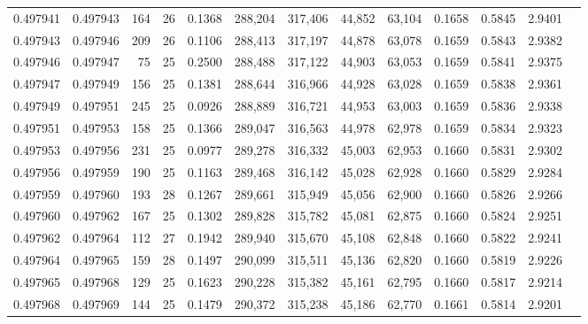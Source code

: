 \begin{tabular}{rrrrrrrrrrrrr}
0.497941 & 0.497943 & 164 &  26 &                                     0.1368 & 288,204 & 317,406 &  44,852 &  63,104 & 0.1658 & 0.5845 & 2.9401 \\
0.497943 & 0.497946 & 209 &  26 &                                     0.1106 & 288,413 & 317,197 &  44,878 &  63,078 & 0.1659 & 0.5843 & 2.9382 \\
0.497946 & 0.497947 &  75 &  25 &                                     0.2500 & 288,488 & 317,122 &  44,903 &  63,053 & 0.1659 & 0.5841 & 2.9375 \\
0.497947 & 0.497949 & 156 &  25 &                                     0.1381 & 288,644 & 316,966 &  44,928 &  63,028 & 0.1659 & 0.5838 & 2.9361 \\
0.497949 & 0.497951 & 245 &  25 &                                     0.0926 & 288,889 & 316,721 &  44,953 &  63,003 & 0.1659 & 0.5836 & 2.9338 \\
0.497951 & 0.497953 & 158 &  25 &                                     0.1366 & 289,047 & 316,563 &  44,978 &  62,978 & 0.1659 & 0.5834 & 2.9323 \\
0.497953 & 0.497956 & 231 &  25 &                                     0.0977 & 289,278 & 316,332 &  45,003 &  62,953 & 0.1660 & 0.5831 & 2.9302 \\
0.497956 & 0.497959 & 190 &  25 &                                     0.1163 & 289,468 & 316,142 &  45,028 &  62,928 & 0.1660 & 0.5829 & 2.9284 \\
0.497959 & 0.497960 & 193 &  28 &                                     0.1267 & 289,661 & 315,949 &  45,056 &  62,900 & 0.1660 & 0.5826 & 2.9266 \\
0.497960 & 0.497962 & 167 &  25 &                                     0.1302 & 289,828 & 315,782 &  45,081 &  62,875 & 0.1660 & 0.5824 & 2.9251 \\
0.497962 & 0.497964 & 112 &  27 &                                     0.1942 & 289,940 & 315,670 &  45,108 &  62,848 & 0.1660 & 0.5822 & 2.9241 \\
0.497964 & 0.497965 & 159 &  28 &                                     0.1497 & 290,099 & 315,511 &  45,136 &  62,820 & 0.1660 & 0.5819 & 2.9226 \\
0.497965 & 0.497968 & 129 &  25 &                                     0.1623 & 290,228 & 315,382 &  45,161 &  62,795 & 0.1660 & 0.5817 & 2.9214 \\
0.497968 & 0.497969 & 144 &  25 &                                     0.1479 & 290,372 & 315,238 &  45,186 &  62,770 & 0.1661 & 0.5814 & 2.9201 \\

\end{tabular}
